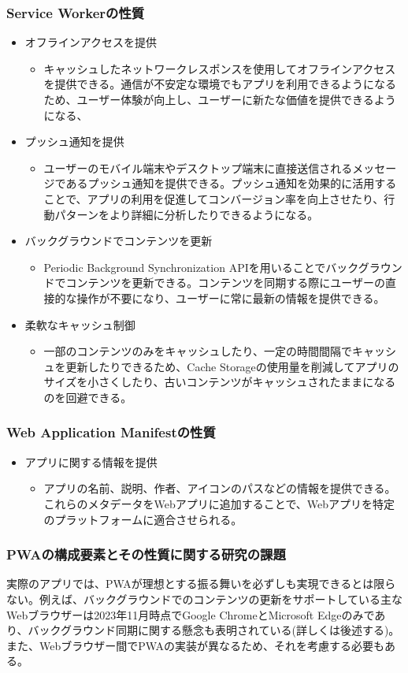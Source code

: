 \subsubsection{Service Workerの性質}\label{subsubsection:Service Workerの性質}
\begin{itemize}
    \item オフラインアクセスを提供
    \begin{itemize}
        \item キャッシュしたネットワークレスポンスを使用してオフラインアクセスを提供できる。通信が不安定な環境でもアプリを利用できるようになるため、ユーザー体験が向上し、ユーザーに新たな価値を提供できるようになる、
    \end{itemize}
    \item プッシュ通知を提供
    \begin{itemize}
        \item ユーザーのモバイル端末やデスクトップ端末に直接送信されるメッセージであるプッシュ通知を提供できる。プッシュ通知を効果的に活用することで、アプリの利用を促進してコンバージョン率を向上させたり、行動パターンをより詳細に分析したりできるようになる。
    \end{itemize}
    \item バックグラウンドでコンテンツを更新
    \begin{itemize}
        \item Periodic Background Synchronization APIを用いることでバックグラウンドでコンテンツを更新できる。コンテンツを同期する際にユーザーの直接的な操作が不要になり、ユーザーに常に最新の情報を提供できる。
    \end{itemize}
    \item 柔軟なキャッシュ制御
    \begin{itemize}
        \item 一部のコンテンツのみをキャッシュしたり、一定の時間間隔でキャッシュを更新したりできるため、Cache Storageの使用量を削減してアプリのサイズを小さくしたり、古いコンテンツがキャッシュされたままになるのを回避できる。
    \end{itemize}
\end{itemize}
\subsubsection{Web Application Manifestの性質}\label{subsubsection:Web Application Manifestの性質}
\begin{itemize}
    \item アプリに関する情報を提供
    \begin{itemize}
        \item アプリの名前、説明、作者、アイコンのパスなどの情報を提供できる。これらのメタデータをWebアプリに追加することで、Webアプリを特定のプラットフォームに適合させられる。
    \end{itemize}
\end{itemize}
\subsubsection{PWAの構成要素とその性質に関する研究の課題}\label{subsubsection:PWAの構成要素とその性質に関する研究の課題}
実際のアプリでは、PWAが理想とする振る舞いを必ずしも実現できるとは限らない。例えば、バックグラウンドでのコンテンツの更新をサポートしている主なWebブラウザーは2023年11月時点でGoogle ChromeとMicrosoft Edgeのみであり、バックグラウンド同期に関する懸念も表明されている(詳しくは後述する)。また、Webブラウザー間でPWAの実装が異なるため、それを考慮する必要もある。
